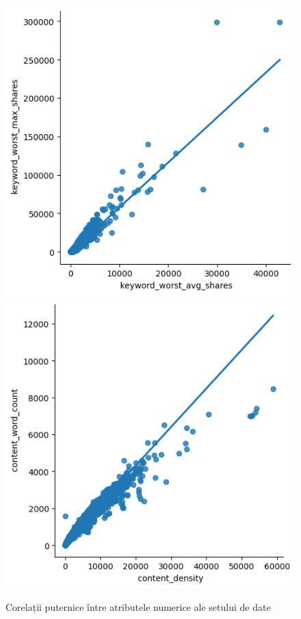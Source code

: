 \documentclass{article}
\begin{document}
\begin{figure}[htb]
    \centering
    \includegraphics[scale=0.5]{news_popularity/analysis/correlation/max-avg.png}
    \includegraphics[scale=0.5]{news_popularity/analysis/correlation/count-density.png}
    \caption{Corelații puternice între atributele numerice ale setului de date}
    \label{fig:news:corr_graphs}
\end{figure}
\end{document}
